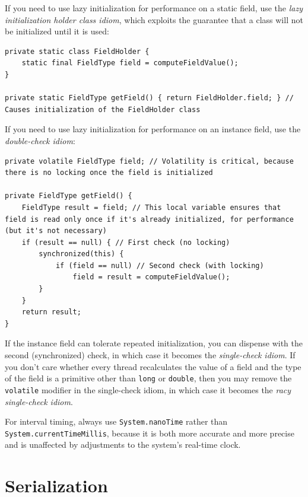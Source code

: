 \documentclass[table, xcdraw]{article}%
\begin{document}
If you need to use lazy initialization for performance on a static field, use the \emph{lazy initialization holder class idiom}, which exploits the guarantee that a class will not be initialized until it is used:

\begin{verbatim}
private static class FieldHolder {
    static final FieldType field = computeFieldValue();
}

private static FieldType getField() { return FieldHolder.field; } // Causes initialization of the FieldHolder class
\end{verbatim}

If you need to use lazy initialization for performance on an instance field, use the \emph{double-check idiom}:

\begin{verbatim}
private volatile FieldType field; // Volatility is critical, because there is no locking once the field is initialized

private FieldType getField() {
    FieldType result = field; // This local variable ensures that field is read only once if it's already initialized, for performance (but it's not necessary)
    if (result == null) { // First check (no locking)
        synchronized(this) {
            if (field == null) // Second check (with locking)
                field = result = computeFieldValue();
        }
    }
    return result;
}
\end{verbatim}

If the instance field can tolerate repeated initialization, you can dispense with the second (synchronized) check, in which case it becomes the \emph{single-check idiom}. If you don’t care whether every thread recalculates the value of a field and the type of the field is a primitive other than \texttt{long} or \texttt{double}, then you may remove the \texttt{volatile} modifier in the single-check idiom, in which case it becomes the \emph{racy single-check idiom}.

For interval timing, always use \texttt{System.nanoTime} rather than \texttt{System.currentTimeMillis}, because it is both more accurate and more precise and is unaffected by adjustments to the system’s real-time clock.

\section{Serialization}
\end{document}
